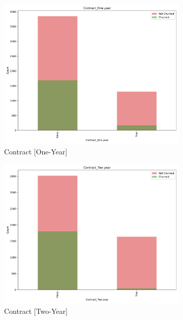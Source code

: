 \documentclass[a4paper,11pt]{article}
\begin{document}
\begin{landscape}
\begin{figure}
\begin{subfigure}{0.14\linewidth}
    \includegraphics[width=\linewidth]{figures/understanding/Contract_One year.pdf}
    \caption{Contract [One-Year]}
\end{subfigure}
\begin{subfigure}{0.14\linewidth}
    \includegraphics[width=\linewidth]{figures/understanding/Contract_Two year.pdf} 
    \caption{Contract [Two-Year]}
\end{subfigure}
\begin{subfigure}{0.14\linewidth}

\end{subfigure}
\end{figure}
\end{landscape}
\end{document}
